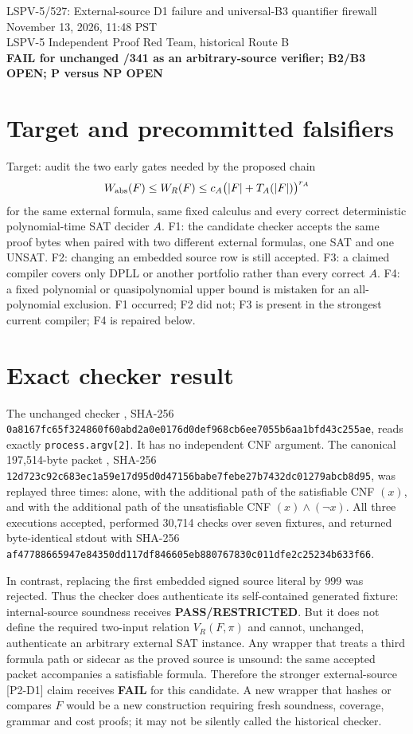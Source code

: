 \documentclass[11pt]{article}
\begin{document}
\begin{center}
{\Large LSPV-5/527: External-source D1 failure and universal-B3 quantifier firewall}\\
November 13, 2026, 11:48 PST\\
LSPV-5 Independent Proof Red Team, historical Route B\\
\textbf{FAIL for unchanged /341 as an arbitrary-source verifier; B2/B3 OPEN; P versus NP OPEN}
\end{center}

\section*{Target and precommitted falsifiers}
Target: audit the two early gates needed by the proposed chain
\[
 W_{\rm abs}(F)\le W_R(F)\le c_A\bigl(|F|+T_A(|F|)\bigr)^{r_A}
\]
for the same external formula, same fixed calculus and every correct deterministic polynomial-time SAT decider $A$.
F1: the candidate checker accepts the same proof bytes when paired with two different external formulas, one SAT and one UNSAT. F2: changing an embedded source row is still accepted. F3: a claimed compiler covers only DPLL or another portfolio rather than every correct $A$. F4: a fixed polynomial or quasipolynomial upper bound is mistaken for an all-polynomial exclusion. F1 occurred; F2 did not; F3 is present in the strongest current compiler; F4 is repaired below.

\section*{Exact checker result}
The unchanged checker , SHA-256
\texttt{0a8167fc65f324860f60abd2a0e0176d0def968cb6ee7055b6aa1bfd43c255ae}, reads exactly \texttt{process.argv[2]}. It has no independent CNF argument. The canonical 197,514-byte packet , SHA-256 \texttt{12d723c92c683ec1a59e17d95d0d47156babe7febe27b7432dc01279abcb8d95}, was replayed three times: alone, with the additional path of the satisfiable CNF $(x)$, and with the additional path of the unsatisfiable CNF $(x)\wedge(\neg x)$. All three executions accepted, performed 30,714 checks over seven fixtures, and returned byte-identical stdout with SHA-256 \texttt{af47788665947e84350dd117df846605eb880767830c011dfe2c25234b633f66}.

In contrast, replacing the first embedded signed source literal by 999 was rejected. Thus the checker does authenticate its self-contained generated fixture: internal-source soundness receives \textbf{PASS/RESTRICTED}. But it does not define the required two-input relation $V_R(F,\pi)$ and cannot, unchanged, authenticate an arbitrary external SAT instance. Any wrapper that treats a third formula path or sidecar as the proved source is unsound: the same accepted packet accompanies a satisfiable formula. Therefore the stronger external-source [P2-D1] claim receives \textbf{FAIL} for this candidate. A new wrapper that hashes or compares $F$ would be a new construction requiring fresh soundness, coverage, grammar and cost proofs; it may not be silently called the historical checker.
\end{document}
